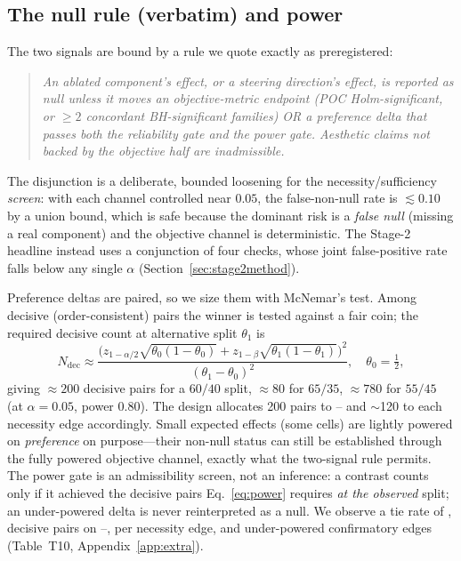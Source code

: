 \subsection{The null rule (verbatim) and power}
The two signals are bound by a rule we quote exactly as preregistered:
\begin{quote}\itshape
An ablated component's effect, or a steering direction's effect, is reported as null unless it
moves an objective-metric endpoint (POC Holm-significant, or $\ge2$ concordant BH-significant
families) OR a preference delta that passes both the reliability gate and the power gate. Aesthetic
claims not backed by the objective half are inadmissible.
\end{quote}
The disjunction is a deliberate, bounded loosening for the necessity/sufficiency \emph{screen}: with
each channel controlled near $0.05$, the false-non-null rate is $\lesssim0.10$ by a union bound,
which is safe because the dominant risk is a \emph{false null} (missing a real component) and the
objective channel is deterministic. The Stage-2 headline instead uses a conjunction of four checks,
whose joint false-positive rate falls below any single $\alpha$ (Section~\ref{sec:stage2method}).

Preference deltas are paired, so we size them with McNemar's test. Among decisive (order-consistent)
pairs the winner is tested against a fair coin; the required decisive count at alternative split
$\theta_1$ is
\begin{equation}
N_{\mathrm{dec}}\approx\frac{\big(z_{1-\alpha/2}\sqrt{\theta_0(1-\theta_0)}+z_{1-\beta}\sqrt{\theta_1(1-\theta_1)}\big)^2}{(\theta_1-\theta_0)^2},
\quad\theta_0=\tfrac12,
\label{eq:power}
\end{equation}
giving $\approx200$ decisive pairs for a $60/40$ split, $\approx80$ for $65/35$, $\approx780$ for
$55/45$ (at $\alpha{=}0.05$, power $0.80$). The design allocates 200 pairs to \FULL--\NEUTRAL{} and
$\sim$120 to each necessity edge accordingly. Small expected effects (some \AOI{} cells) are lightly
powered on \emph{preference} on purpose---their non-null status can still be established through the
fully powered objective channel, exactly what the two-signal rule permits. The power gate is an
admissibility screen, not an inference: a contrast counts only if it achieved the decisive pairs
Eq.~\ref{eq:power} requires \emph{at the observed} split; an under-powered delta is never
reinterpreted as a null. We observe a tie rate of ,  decisive pairs
on \FULL--\NEUTRAL,  per necessity edge, and  under-powered
confirmatory edges (Table~T10, Appendix~\ref{app:extra}).
